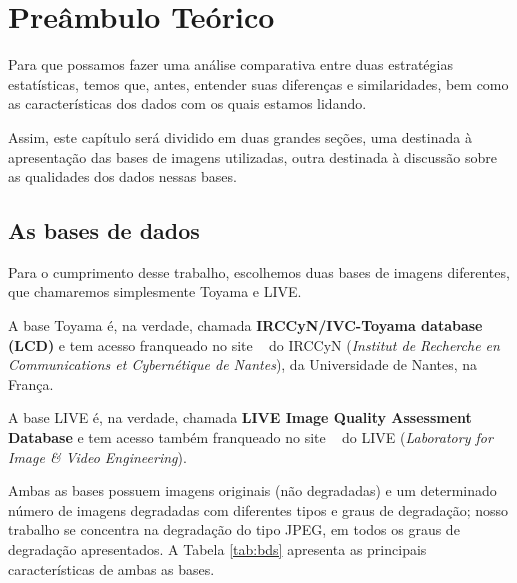 \chapter{Preâmbulo Teórico}

Para que possamos fazer uma análise comparativa entre duas estratégias estatísticas, temos que, antes, entender suas diferenças e similaridades, bem como as características dos dados com os quais estamos lidando.

Assim, este capítulo será dividido em duas grandes seções, uma destinada à apresentação das bases de imagens utilizadas, outra destinada à discussão sobre as qualidades dos dados nessas bases.

\section{As bases de dados}

Para o cumprimento desse trabalho, escolhemos duas bases de imagens diferentes, que chamaremos simplesmente Toyama e LIVE.

A base Toyama é, na verdade, chamada \textbf{IRCCyN/IVC-Toyama database (LCD)} e tem acesso franqueado no site ~\cite{Tourancheau2008} do IRCCyN (\emph{Institut de Recherche en Communications et Cybernétique de Nantes}), da Universidade de Nantes, na França.

A base LIVE é, na verdade, chamada \textbf{LIVE Image Quality Assessment Database} e tem acesso também franqueado no site ~\cite{livedb} do LIVE (\emph{Laboratory for Image \& Video Engineering}).

Ambas as bases possuem imagens originais (não degradadas) e um determinado número de imagens degradadas com diferentes tipos e graus de degradação; nosso trabalho se concentra na degradação do tipo JPEG, em todos os graus de degradação apresentados. A Tabela \ref{tab:bds} apresenta as principais características de ambas as bases.

